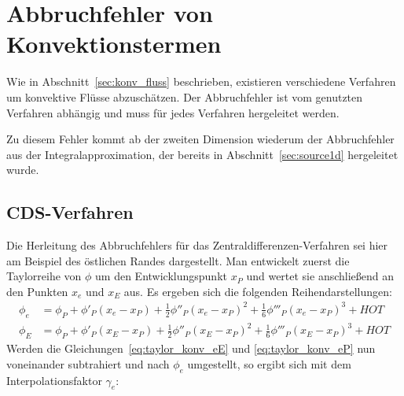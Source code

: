 \section{Abbruchfehler von Konvektionstermen}

Wie in Abschnitt~\ref{sec:konv_fluss} beschrieben, existieren verschiedene Verfahren
um konvektive Flüsse abzuschätzen. Der Abbruchfehler ist vom genutzten Verfahren
abhängig und muss für jedes Verfahren hergeleitet werden.

Zu diesem Fehler kommt ab der zweiten Dimension wiederum der Abbruchfehler aus
der Integralapproximation, der bereits in Abschnitt~\ref{sec:source1d} hergeleitet wurde.

\subsection{CDS-Verfahren}
\label{sec:te_cds}

Die Herleitung des Abbruchfehlers für das Zentraldifferenzen-Verfahren sei hier am Beispiel des östlichen Randes dargestellt.
Man entwickelt zuerst die Taylorreihe von $\phi$ um den Entwicklungspunkt $x_P$ und wertet sie anschließend
an den Punkten $x_e$ und $x_E$ aus. Es ergeben sich die folgenden Reihendarstellungen:
\begin{align}
  \phi_e &= \phi_P + \phi'_P(x_e-x_P)+\frac{1}{2}\phi''_P(x_e-x_P)^2
  +\frac{1}{6}\phi'''_P(x_e-x_P)^3+HOT
  \label{eq:taylor_konv_eP}\\
  \phi_E &= \phi_P + \phi'_P(x_E-x_P)+\frac{1}{2}\phi''_P(x_E-x_P)^2
  +\frac{1}{6}\phi'''_P(x_E-x_P)^3+HOT
  \label{eq:taylor_konv_eE}
\end{align}
Werden die Gleichungen~\ref{eq:taylor_konv_eE} und \ref{eq:taylor_konv_eP} nun
voneinander subtrahiert und nach $\phi_e$ umgestellt, so ergibt sich mit dem
Interpolationsfaktor $\gamma_e$:


